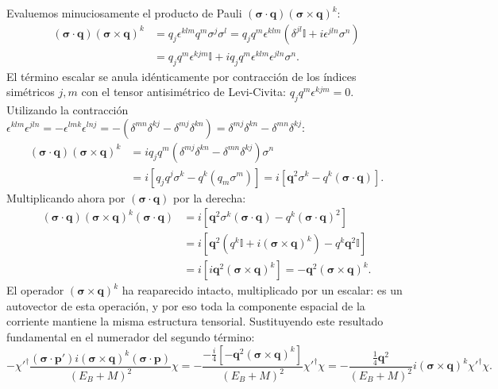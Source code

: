 \documentclass[10pt,a4paper]{article}
\begin{document}
Evaluemos minuciosamente el producto de Pauli $(\boldsymbol{\sigma} \cdot \mathbf{q}) (\boldsymbol{\sigma} \times \mathbf{q})^k$:
\begin{align}
(\boldsymbol{\sigma} \cdot \mathbf{q}) (\boldsymbol{\sigma} \times \mathbf{q})^k &= q_j \epsilon^{klm} q^m \sigma^j \sigma^l = q_j q^m \epsilon^{klm} (\delta^{jl} \mathbb{I} + i \epsilon^{jln}\sigma^n) \nonumber \\
&= q_j q^m \epsilon^{kjm} \mathbb{I} + i q_j q^m \epsilon^{klm} \epsilon^{jln} \sigma^n.
\end{align}
El término escalar se anula idénticamente por contracción de los índices simétricos $j, m$ con el tensor antisimétrico de Levi-Civita: $q_j q^m \epsilon^{kjm} = 0$. Utilizando la contracción $\epsilon^{klm}\epsilon^{jln} = - \epsilon^{lmk}\epsilon^{lnj} = -(\delta^{mn}\delta^{kj} - \delta^{mj}\delta^{kn}) = \delta^{mj}\delta^{kn} - \delta^{mn}\delta^{kj}$:
\begin{align}
(\boldsymbol{\sigma} \cdot \mathbf{q}) (\boldsymbol{\sigma} \times \mathbf{q})^k &= i q_j q^m (\delta^{mj}\delta^{kn} - \delta^{mn}\delta^{kj}) \sigma^n \nonumber \\
&= i \left[ q_j q^j \sigma^k - q^k (q_m \sigma^m) \right] = i \left[ \mathbf{q}^2 \sigma^k - q^k (\boldsymbol{\sigma} \cdot \mathbf{q}) \right].
\end{align}
Multiplicando ahora por $(\boldsymbol{\sigma} \cdot \mathbf{q})$ por la derecha:
\begin{align}
(\boldsymbol{\sigma} \cdot \mathbf{q}) (\boldsymbol{\sigma} \times \mathbf{q})^k (\boldsymbol{\sigma} \cdot \mathbf{q}) &= i \left[ \mathbf{q}^2 \sigma^k (\boldsymbol{\sigma} \cdot \mathbf{q}) - q^k (\boldsymbol{\sigma} \cdot \mathbf{q})^2 \right] \nonumber \\
&= i \left[ \mathbf{q}^2 (q^k \mathbb{I} + i (\boldsymbol{\sigma} \times \mathbf{q})^k) - q^k \mathbf{q}^2 \mathbb{I} \right] \nonumber \\
&= i \left[ i \mathbf{q}^2 (\boldsymbol{\sigma} \times \mathbf{q})^k \right] = - \mathbf{q}^2 (\boldsymbol{\sigma} \times \mathbf{q})^k.
\end{align}
El operador $(\boldsymbol{\sigma}\times\mathbf{q})^k$ ha reaparecido intacto, multiplicado por un escalar: es un autovector de esta operación, y por eso toda la componente espacial de la corriente mantiene la misma estructura tensorial. Sustituyendo este resultado fundamental en el numerador del segundo término:
\begin{equation}
- \chi'^\dagger \frac{(\boldsymbol{\sigma} \cdot \mathbf{p}') i(\boldsymbol{\sigma} \times \mathbf{q})^k (\boldsymbol{\sigma} \cdot \mathbf{p})}{(E_B + M)^2} \chi = - \frac{- \frac{i}{4} [ - \mathbf{q}^2 (\boldsymbol{\sigma} \times \mathbf{q})^k ]}{(E_B + M)^2} \chi'^\dagger \chi = - \frac{\frac{1}{4} \mathbf{q}^2}{(E_B + M)^2} i (\boldsymbol{\sigma} \times \mathbf{q})^k \chi'^\dagger \chi.
\end{equation}
\end{document}
